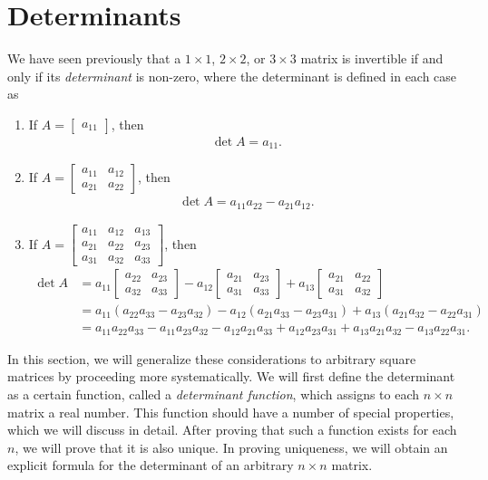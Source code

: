 \documentclass[12pt,letterpaper,reqno]{article}
\numberwithin{equation}{section}
\newcommand{\ti}[1]{\textit{#1}}
\begin{document}
\section{Determinants}
We have seen previously that a $1 \times 1$, $2 \times 2$, or $3 \times 3$ matrix is invertible if and only if its \ti{determinant} is non-zero, where the determinant is defined in each case as
\begin{enumerate}
	\item If $A=\begin{bmatrix} a_{11} \end{bmatrix}$, then 
	\begin{align*}
		\det A=a_{11}.
	\end{align*} 
	\item If $A=\begin{bmatrix}
		a_{11} & a_{12} \\ a_{21} & a_{22}
	\end{bmatrix}$, then 
	\begin{align*}
		\det A=a_{11}a_{22}-a_{21}a_{12}.
	\end{align*}
	\item If $A=\begin{bmatrix}
		a_{11} & a_{12} & a_{13} \\ a_{21} & a_{22} & a_{23} \\ a_{31} & a_{32} & a_{33}
	\end{bmatrix}$, then 
\begin{align*}
	\det A &=a_{11}\begin{bmatrix}
		a_{22} & a_{23} \\ a_{32} & a_{33}
	\end{bmatrix}-a_{12}\begin{bmatrix}
		a_{21} & a_{23} \\
		a_{31} & a_{33}
	\end{bmatrix}+a_{13}\begin{bmatrix}
		a_{21} & a_{22} \\ 
		a_{31} & a_{32}
	\end{bmatrix} \\
	&=a_{11}(a_{22}a_{33}-a_{23}a_{32})-a_{12}(a_{21}a_{33}-a_{23}a_{31})+a_{13}(a_{21}a_{32}-a_{22}a_{31}) \\
	&=a_{11}a_{22}a_{33}-a_{11}a_{23}a_{32}-a_{12}a_{21}a_{33}+a_{12}a_{23}a_{31}+a_{13}a_{21}a_{32}-a_{13}a_{22}a_{31}.
\end{align*}
\end{enumerate}

In this section, we will generalize these considerations to arbitrary square matrices by proceeding more systematically. We will first define the determinant as a certain function, called a \ti{determinant function}, which assigns to each $n \times n$ matrix a real number. This function should have a number of special properties, which we will discuss in detail. After proving that such a function exists for each $n$, we will prove that it is also unique. In proving uniqueness, we will obtain an explicit formula for the determinant of an arbitrary $n \times n$ matrix.
\end{document}
